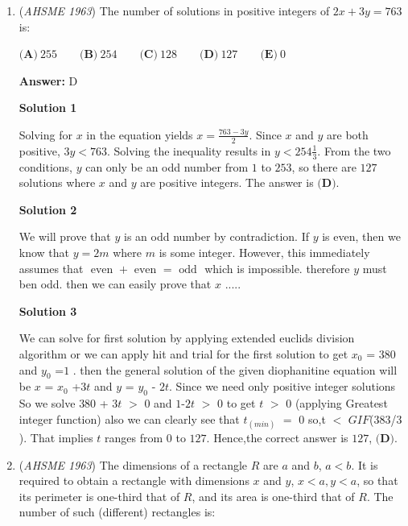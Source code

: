 \begin{enumerate}
	\item (\textit{AHSME 1963}) The number of solutions in positive integers of $2x+3y=763$ is:


 $\textbf{(A)}\ 255 \qquad \textbf{(B)}\ 254\qquad \textbf{(C)}\ 128 \qquad \textbf{(D)}\ 127 \qquad \textbf{(E)}\ 0$

 \textbf{Answer: }D



\textbf{Solution 1}

Solving for $x$ in the equation yields $x = \frac{763-3y}{2}$. Since $x$ and $y$ are both positive, $3y < 763$.  Solving the inequality results in $y < 254 \frac{1}{3}$.  From the two conditions, $y$ can only be an odd number from $1$ to $253$, so there are $127$ solutions where $x$ and $y$ are positive integers. The answer is $\boxed{\textbf{(D)}}$.

 



\textbf{Solution 2}

We will prove that $y$ is an odd number by contradiction. If $y$ is even, then we know that $y = 2m$ where $m$ is some integer. However, this immediately assumes that $\text{ even } + \text{ even } = \text{ odd }$ which is impossible. therefore $y$ must ben odd. then we can easily prove that $x$ .....

 



\textbf{Solution 3}

We can solve for first solution by applying extended euclids division algorithm or we can apply hit and trial for the first solution to get $x_0$ = $380$ and $y_0$ =$1$ . then the general solution of the given diophanitine equation will be $x$ = $x_0$ +$3t$ and $y$ = $y_0$ - $2t$. Since we need only positive integer solutions So we solve $380$ + $3t$ $>$ $0$ and $1$-$2t$ $>$ $0$ to get $t$ $>$ $0$ (applying Greatest integer function) also we can clearly see that $t_{(min)}$ $=$ $0$ so,t $<$ $GIF$($383$/$3$). That implies $t$ ranges from $0$ to $127$. Hence,the correct answer is $127$, $\boxed{\textbf{(D)}}$. 

 


	\item (\textit{AHSME 1963}) The dimensions of a rectangle $R$ are $a$ and $b$, $a < b$. It is required to obtain a rectangle with dimensions $x$ and $y$, $x < a, y < a$, 
so that its perimeter is one-third that of $R$, and its area is one-third that of $R$. The number of such (different) rectangles is:



\end{enumerate}
